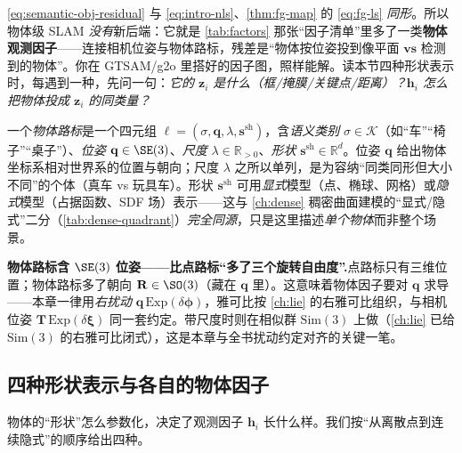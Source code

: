 \begin{insight}
\cref{eq:semantic-obj-residual} 与 \cref{eq:intro-nls}、\cref{thm:fg-map} 的 \cref{eq:fg-ls} \emph{同形}。所以物体级 SLAM \emph{没有}新后端：它就是 \cref{tab:factors} 那张“因子清单”里多了一类\textbf{物体观测因子}——连接相机位姿与物体路标，残差是“物体按位姿投到像平面 $\textbf{vs}$ 检测到的物体”。你在 GTSAM/g2o 里搭好的因子图，照样能解。读本节四种形状表示时，每遇到一种，先问一句：\emph{它的 $\mathbf{z}_i$ 是什么（框/掩膜/关键点/距离）？$\mathbf{h}_i$ 怎么把物体投成 $\mathbf{z}_i$ 的同类量？}
\end{insight}

\begin{definition}[物体路标]\label{def:semantic-object}
一个\emph{物体路标}是一个四元组 $\boldsymbol\ell=(\sigma,\mathbf{q},\lambda,\mathbf{s}^{\mathrm{sh}})$，含\emph{语义类别} $\sigma\in\mathcal{K}$（如“车”“椅子”“桌子”）、\emph{位姿} $\mathbf{q}\in\SE(3)$、\emph{尺度} $\lambda\in\mathbb{R}_{>0}$、\emph{形状} $\mathbf{s}^{\mathrm{sh}}\in\mathbb{R}^d$\cite{carlone2026handbook}。位姿 $\mathbf{q}$ 给出物体坐标系相对世界系的位置与朝向；尺度 $\lambda$ 之所以单列，是为容纳“同类同形但大小不同”的个体（真车 vs 玩具车）。形状 $\mathbf{s}^{\mathrm{sh}}$ 可用\emph{显式}模型（点、椭球、网格）或\emph{隐式}模型（占据函数、SDF 场）表示——这与 \cref{ch:dense} 稠密曲面建模的“显式/隐式”二分（\cref{tab:dense-quadrant}）\emph{完全同源}，只是这里描述\emph{单个物体}而非整个场景。
\end{definition}

\begin{note}
\textbf{物体路标含 $\SE(3)$ 位姿——比点路标“多了三个旋转自由度”.}\;点路标只有三维位置；物体路标多了朝向 $\mathbf{R}\in\SO(3)$（藏在 $\mathbf{q}$ 里）。这意味着物体因子要对 $\mathbf{q}$ 求导——本章一律用\emph{右扰动} $\mathbf{q}\,\mathrm{Exp}(\delta\boldsymbol\phi)$，雅可比按 \cref{ch:lie} 的右雅可比组织，与相机位姿 $\mathbf{T}\,\mathrm{Exp}(\delta\boldsymbol\xi)$ 同一套约定。带尺度时则在相似群 $\mathrm{Sim}(3)$ 上做（\cref{ch:lie} 已给 $\mathrm{Sim}(3)$ 的右雅可比闭式），这是本章与全书扰动约定对齐的关键一笔。
\end{note}

\subsection{四种形状表示与各自的物体因子}
\label{sec:semantic-object-shape}

物体的“形状”怎么参数化，决定了观测因子 $\mathbf{h}_i$ 长什么样。我们按“从离散点到连续隐式”的顺序给出四种\cite{carlone2026handbook}。


